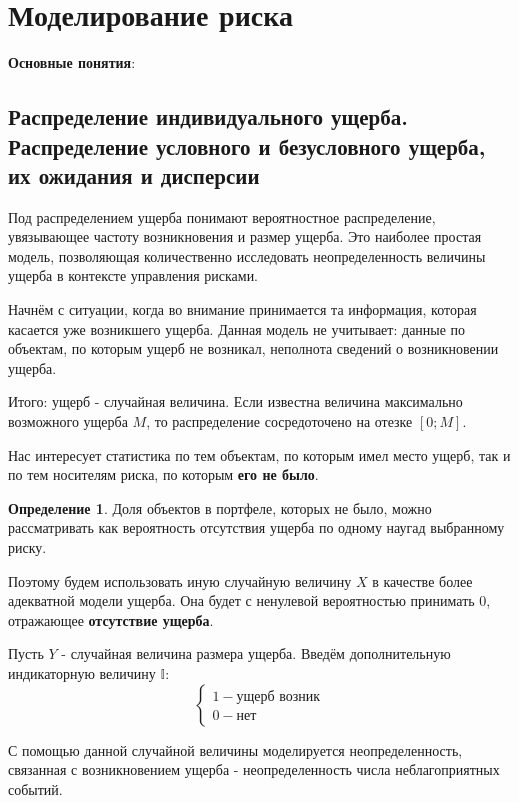\documentclass[%
12pt, %
final, %
oneside, %
onecolumn, %
centertags]{article} %
\theoremstyle{plain}
\theoremstyle{definition}
\newtheorem{definition}{Определение}[subsection]
\theoremstyle{remark}
\begin{document}
\newpage
\section{Моделирование риска}

\textbf{Основные понятия}:

\subsection{Распределение индивидуального ущерба. Распределение условного и безусловного ущерба, их ожидания и дисперсии}

Под распределением ущерба понимают вероятностное распределение, увязывающее частоту возникновения и размер ущерба. Это наиболее простая модель, позволяющая количественно исследовать неопределенность величины ущерба в контексте
управления рисками.

Начнём с ситуации, когда во внимание принимается та информация, которая касается уже возникшего ущерба. Данная модель не учитывает: данные по объектам, по которым ущерб не возникал, неполнота сведений о возникновении ущерба.

Итого: ущерб - случайная величина. Если известна величина максимально возможного ущерба $M$, то распределение сосредоточено на отезке $[0;M]$.

Нас интересует статистика по тем объектам, по которым имел место ущерб, так и по тем носителям риска, по которым \textbf{его не было}. 

\begin{definition}
	Доля объектов в портфеле, которых не было, можно рассматривать как вероятность отсутствия ущерба по одному наугад выбранному риску.
\end{definition}

Поэтому будем использовать иную случайную величину $X$ в качестве более адекватной модели ущерба. Она будет с ненулевой вероятностью принимать $\text{0}$, отражающее \textbf{отсутствие ущерба}.

Пусть $Y$ - случайная величина размера ущерба. Введём дополнительную индикаторную величину $\mathbb{I}$:
$$\begin{cases}
	1  - \text{ущерб возник}\\
	0 - \text{нет}
\end{cases}$$

С помощью данной случайной величины моделируется неопределенность, связанная с возникновением ущерба - неопределенность числа неблагоприятных событий.
\end{document}
